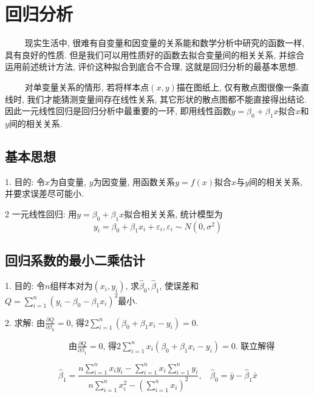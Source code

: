 \section{回归分析}

\begin{tcolorbox}[colback=red!5,colframe=red!75!black]
    ~~~~ 现实生活中, 很难有自变量和因变量的关系能和数学分析中研究的函数一样, 具有良好的性质. 但是我们可以用性质好的函数去拟合变量间的相关关系, 并综合运用前述统计方法, 评价这种拟合到底合不合理, 这就是回归分析的最基本思想.

    ~~~~ 对单变量关系的情形, 若将样本点$(x,y)$描在图纸上, 仅有散点图很像一条直线时, 我们才能猜测变量间存在线性关系, 其它形状的散点图都不能直接得出结论. 因此一元线性回归是回归分析中最重要的一环, 即用线性函数$y=\beta_0+\beta_1 x$拟合$x$和$y$间的相关关系. 
\end{tcolorbox}

\subsection{基本思想}

1. 目的: 令$x$为自变量, $y$为因变量, 用函数关系$y=f(x)$拟合$x$与$y$间的相关关系, 并要求误差尽可能小.

2 一元线性回归: 用$y=\beta_0+\beta_1 x$拟合相关关系, 统计模型为
\begin{equation*}
    y_i=\beta_0+\beta_1 x_i +\varepsilon_i , \varepsilon_i \sim N(0,\sigma^2)
\end{equation*}

\subsection{回归系数的最小二乘估计}

1. 目的: 令$n$组样本对为$(x_i,y_i)$, 求$\hat{\beta}_0,\hat{\beta}_1$, 使误差和$Q=\sum\limits_{i=1}^n (y_i-\beta_0-\beta_1 x_i)^2$最小.

2. 求解: 由$\frac{\partial Q}{\partial \beta_0}=0$, 得$2\sum\limits_{i=1}^n (\beta_0+\beta_1x_i-y_i)=0$.

~~~~~~~~~~~~~~~由$\frac{\partial Q}{\partial \beta_1}=0$, 得$2\sum\limits_{i=1}^n x_i(\beta_0+\beta_1x_i-y_i)=0$. 联立解得

\begin{equation*}
    \hat{\beta}_1=\frac{n\sum\limits_{i=1}^n x_iy_i-\sum\limits_{i=1}^n x_i \sum\limits_{i=1}^n y_i}{n\sum\limits_{i=1}^n x_i^2 -(\sum\limits_{i=1}^n x_i)^2} , ~~~~\hat{\beta}_0=\bar{y}-\hat{\beta}_1\bar{x}
\end{equation*}

